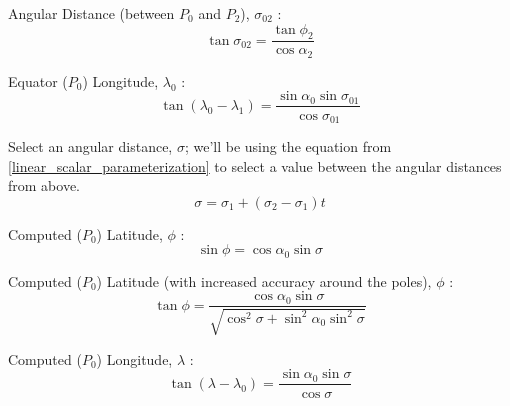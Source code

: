 \documentclass{article}
\begin{document}
Angular Distance (between $P_0$ and $P_2$), $\sigma_{02}$
\cite[Finding way-points]{wikipedia_Great-circle_navigation}:
\begin{equation}
    \tan{\sigma_{02}} = \frac{
        \tan{\phi_2}
    }{
        \cos{\alpha_2}
    }
\end{equation}

Equator ($P_0$) Longitude, $\lambda_0$
\cite[Finding way-points]{wikipedia_Great-circle_navigation}:
\begin{equation}
    \tan{\left(\lambda_0 - \lambda_1\right)} = \frac{
        \sin{\alpha_0} \sin{\sigma_{01}}
    }{
        \cos{\sigma_{01}}
    }
\end{equation}

Select an angular distance, $\sigma$; we'll be using the equation
from \eqref{linear_scalar_parameterization} to select a value
between the angular distances from above.
\begin{equation}
    \sigma = \sigma_1 + \left(\sigma_2 - \sigma_1\right)t
\end{equation}

Computed ($P_0$) Latitude, $\phi$
\cite[Finding way-points]{wikipedia_Great-circle_navigation}:
\begin{equation}
    \sin{\phi} = \cos{\alpha_0} \sin{\sigma}
\end{equation}

Computed ($P_0$) Latitude (with increased accuracy around the poles), 
$\phi$ \cite[Finding way-points]{wikipedia_Great-circle_navigation}:
\begin{equation}
    \tan{\phi} = \frac{
        \cos{\alpha_0} \sin{\sigma}
    }{
        \sqrt{\cos^2{\sigma} + \sin^2{\alpha_0} \sin^2{\sigma}}
    }
\end{equation}

Computed ($P_0$) Longitude, $\lambda$
\cite[Finding way-points]{wikipedia_Great-circle_navigation}:
\begin{equation}
    \tan{\left(\lambda - \lambda_0\right)} = \frac{
        \sin{\alpha_0} \sin{\sigma}
    }{
        \cos{\sigma}
    }
\end{equation}
\end{document}
